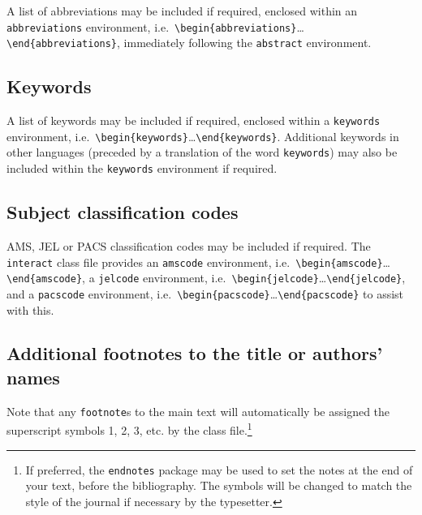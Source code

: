 \documentclass[]{interact}
\theoremstyle{plain}%
\theoremstyle{definition}
\theoremstyle{remark}
\begin{document}
A list of abbreviations may be included if required, enclosed within an
\texttt{abbreviations} environment,
i.e.~\texttt{\textbackslash{}begin\{abbreviations\}}\ldots\texttt{\textbackslash{}end\{abbreviations\}},
immediately following the \texttt{abstract} environment.

\hypertarget{keywords}{%
\subsection{Keywords}\label{keywords}}

A list of keywords may be included if required, enclosed within a
\texttt{keywords} environment,
i.e.~\texttt{\textbackslash{}begin\{keywords\}}\ldots\texttt{\textbackslash{}end\{keywords\}}.
Additional keywords in other languages (preceded by a translation of the
word \texttt{keywords}) may also be included within the
\texttt{keywords} environment if required.

\hypertarget{subject-classification-codes}{%
\subsection{Subject classification
codes}\label{subject-classification-codes}}

AMS, JEL or PACS classification codes may be included if required. The
\texttt{interact} class file provides an \texttt{amscode} environment,
i.e.~\texttt{\textbackslash{}begin\{amscode\}}\ldots\texttt{\textbackslash{}end\{amscode\}},
a \texttt{jelcode} environment,
i.e.~\texttt{\textbackslash{}begin\{jelcode\}}\ldots\texttt{\textbackslash{}end\{jelcode\}},
and a \texttt{pacscode} environment,
i.e.~\texttt{\textbackslash{}begin\{pacscode\}}\ldots\texttt{\textbackslash{}end\{pacscode\}}
to assist with this.

\hypertarget{additional-footnotes-to-the-title-or-authors-names}{%
\subsection{Additional footnotes to the title or authors'
names}\label{additional-footnotes-to-the-title-or-authors-names}}

Note that any \texttt{footnote}s to the main text will automatically be
assigned the superscript symbols 1, 2, 3, etc. by the class
file.\footnote{If preferred, the \texttt{endnotes} package may be used
  to set the notes at the end of your text, before the bibliography. The
  symbols will be changed to match the style of the journal if necessary
  by the typesetter.}
\end{document}
